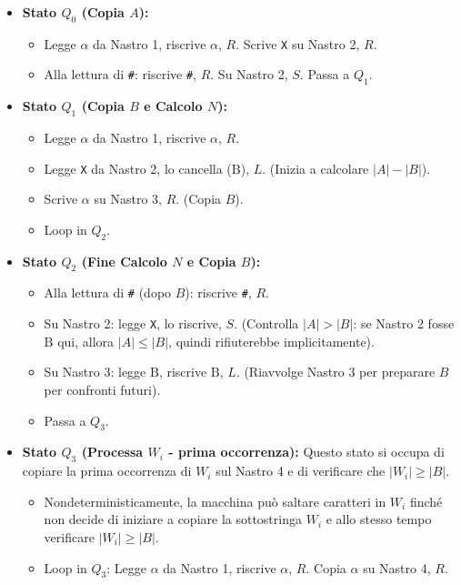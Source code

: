 \documentclass[a4paper]{article}
\newcommand{\B}{\text{B}} %
\begin{document}
\begin{itemize}
    \item \textbf{Stato $Q_0$ (Copia $A$):}
        \begin{itemize}
            \item Legge $\alpha$ da Nastro 1, riscrive $\alpha$, $R$. Scrive \texttt{X} su Nastro 2, $R$.
            \item Alla lettura di \texttt{\#}: riscrive \texttt{\#}, $R$. Su Nastro 2, $S$. Passa a $Q_1$.
        \end{itemize}
    \item \textbf{Stato $Q_1$ (Copia $B$ e Calcolo $N$):}
        \begin{itemize}
            \item Legge $\alpha$ da Nastro 1, riscrive $\alpha$, $R$.
            \item Legge \texttt{X} da Nastro 2, lo cancella ($\B$), $L$. (Inizia a calcolare $|A|-|B|$).
            \item Scrive $\alpha$ su Nastro 3, $R$. (Copia $B$).
            \item Loop in $Q_2$.
        \end{itemize}
    \item \textbf{Stato $Q_2$ (Fine Calcolo $N$ e Copia $B$):}
        \begin{itemize}
            \item Alla lettura di \texttt{\#} (dopo $B$): riscrive \texttt{\#}, $R$.
            \item Su Nastro 2: legge \texttt{X}, lo riscrive, $S$. (Controlla $|A|>|B|$: se Nastro 2 fosse $\B$ qui, allora $|A| \le |B|$, quindi rifiuterebbe implicitamente).
            \item Su Nastro 3: legge $\B$, riscrive $\B$, $L$. (Riavvolge Nastro 3 per preparare $B$ per confronti futuri).
            \item Passa a $Q_3$.
        \end{itemize}
    \item \textbf{Stato $Q_3$ (Processa $W_i$ - prima occorrenza):}
        Questo stato si occupa di copiare la prima occorrenza di $W_i$ sul Nastro 4 e di verificare che $|W_i| \ge |B|$.
        \begin{itemize}
            \item Nondeterministicamente, la macchina può saltare caratteri in $W_i$ finché non decide di iniziare a copiare la sottostringa $W_i$ e allo stesso tempo verificare $|W_i| \ge |B|$.
            \item Loop in $Q_3$: Legge $\alpha$ da Nastro 1, riscrive $\alpha$, $R$. Copia $\alpha$ su Nastro 4, $R$.

\end{itemize}
\end{itemize}
\end{document}
